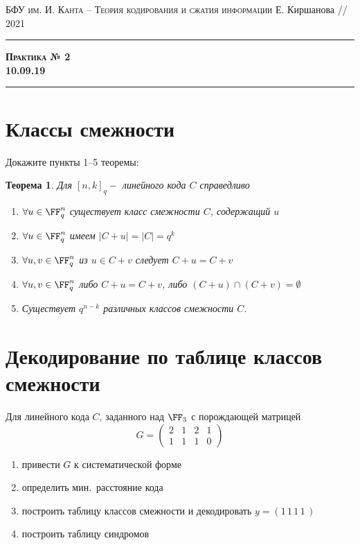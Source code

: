 \documentclass[11pt]{exam}
\newtheorem{theorem}{Теорема}
\theoremstyle{definition}
\begin{document}
	{\noindent
		\textsc{БФУ им. И. Канта -- Теория кодирования и сжатия информации}
		\hfill {Е. Киршанова // 2021\\}
	\hrule
	\begin{center}
		{\Large\textbf{
				\textsc{Практика № 2} \\[5pt] {10.09.19}
		} } 
	\end{center}
	\hrule \vspace{5mm}
	
	\thispagestyle{empty}
	
	\vspace{0.2cm}
	
\section{Классы смежности}
Докажите пункты 1--5 теоремы:
\begin{theorem}
	Для $[n,k]_q-$ линейного кода $C$ справедливо
	\begin{enumerate}
		\item $\forall u \in \FF_q^n$ существует класс смежности $C$, содержащий $u$
		\item $\forall u \in \FF_q^n$ имеем $|C+u| = |C| = q^k$
		\item $\forall u, v\in \FF_q^n$ из $u \in C+v$ следует $C+u  = C + v$
		\item $\forall u, v\in \FF_q^n$ либо $C+u = C+v$, либо $(C+u) \cap (C+v) = \emptyset$
		\item  Существует $q^{n-k}$ различных классов смежности $C$.
	\end{enumerate}
\end{theorem} 

\section{Декодирование по таблице классов смежности}
	Для линейного кода $C$, заданного над $\FF_3$ с порождающей матрицей
	\[
		G = 
		\begin{pmatrix}
		2& 1&2&1 \\
		1&1&1&0
		\end{pmatrix}
	\]
	\begin{enumerate}
		\item привести $G$ к систематической форме
		\item определить мин.\ расстояние кода
		\item построить таблицу классов смежности и декодировать $y = (1\, 1\, 1\, 1\,)$
		\item построить таблицу синдромов
	\end{enumerate}
}
\end{document}
